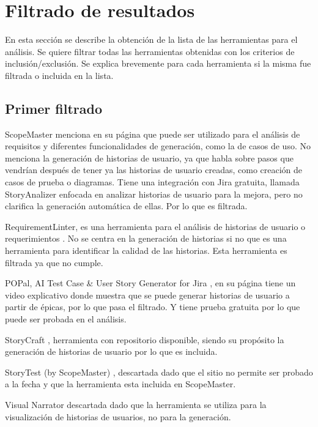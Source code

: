 \section{Filtrado de resultados}

En esta sección se describe la obtención de la lista de las herramientas para el análisis. Se quiere filtrar todas las herramientas obtenidas con los criterios de inclusión/exclusión.  Se explica brevemente para cada herramienta si la misma fue filtrada o incluida en la lista.

\subsection{Primer filtrado}
ScopeMaster \cite{scopemaster} menciona en su página que puede ser utilizado para el análisis de requisitos y diferentes funcionalidades de generación, como la de casos de uso. No menciona la generación de historias de usuario, ya que habla sobre pasos que vendrían después de tener ya las historias de usuario creadas, como creación de casos de prueba o diagramas.
Tiene una integración con Jira gratuita, llamada StoryAnalizer \cite{storyanalizer}
enfocada en analizar historias de usuario para la mejora, pero no clarifica la generación automática de ellas. Por lo que es filtrada.

RequirementLinter, es una herramienta para el análisis de historias de usuario o requerimientos \cite{requirementlinter}. No se centra en la generación de historias si no que es una herramienta para identificar la calidad de las historias. Esta herramienta es filtrada ya que no cumple.

POPal, AI Test Case \& User Story Generator for Jira \cite{popal},  en su página tiene un video explicativo donde muestra que se puede generar historias de usuario a partir de épicas, por lo que pasa el filtrado. Y tiene prueba gratuita por lo que puede ser probada en el análisis.

StoryCraft \cite{storycraft},  herramienta con repositorio disponible, siendo su propósito la generación de historias de usuario por lo que es incluida.

StoryTest (by ScopeMaster) \cite{storytest}, descartada dado que el sitio no permite ser probado a la fecha y que la herramienta esta incluida en ScopeMaster.

Visual Narrator \cite{visualnarrator} descartada dado que la herramienta se utiliza para la visualización de historias de usuarios, no para la generación.

